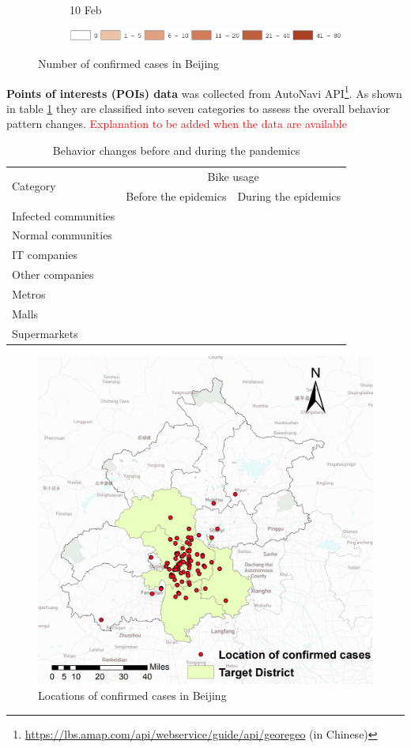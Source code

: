 \documentclass[preprints,ijgi,submit,moreauthors]{Definitions/mdpi}
\begin{document}
\begin{figure}[H]
\begin{subfigure}{.23\textwidth}
        \caption{10 Feb}
    \end{subfigure}
    \begin{subfigure}{0.7\textwidth}
        \includegraphics[width=\textwidth]{Figures/Fig2legend.eps}
    \end{subfigure}
    \caption{Number of confirmed cases in Beijing}
    \label{fig:number_of_confirmed_cases}
\end{figure}

\textbf{Points of interests (POIs) data} was collected from AutoNavi API\footnote{\url{https://lbs.amap.com/api/webservice/guide/api/georegeo} (in Chinese)}.
As shown in table \ref{tab:bike_usage} they are classified into seven categories to assess the overall behavior pattern changes.
\textcolor{red}{Explanation to be added when the data are available}

\begin{table}[H]
    \centering
    \begin{tabular}{|l|l|l|}
        \hline
        \multirow{2}{*}{Category} & \multicolumn{2}{c|}{Bike usage}\\
        \cline{2-3}
        & Before the epidemics & During the epidemics\\
        \hline
        Infected communities&&\\
        \hline
        Normal communities&&\\
        \hline
        IT companies&&\\
        \hline
        Other companies&&\\
        \hline
        Metros&&\\
        \hline
        Malls&&\\
        \hline
        Supermarkets&&\\
        \hline
    \end{tabular}
    \caption{Behavior changes before and during the pandemics}
    \label{tab:bike_usage}
\end{table}

\begin{figure}[H]
    \centering
    \includegraphics[width=.5\textwidth]{Figures/Plot_location_confirmed_cases.png}
    \caption{Locations of confirmed cases in Beijing}
    \label{fig:locations_of_confirmed_cases}
\end{figure}
\end{document}
